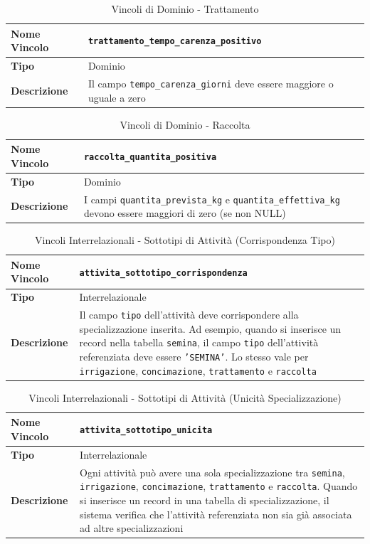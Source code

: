 \documentclass[12pt,a4paper]{article}
\begin{document}
\begin{table}[H]
\centering
\caption{Vincoli di Dominio - Trattamento}
\begin{tabularx}{\textwidth}{|l|X|}
\hline
\textbf{Nome Vincolo} & \texttt{trattamento\_tempo\_carenza\_positivo} \\
\hline
\textbf{Tipo} & Dominio \\
\hline
\textbf{Descrizione} & Il campo \texttt{tempo\_carenza\_giorni} deve essere maggiore o uguale a zero \\
\hline
\end{tabularx}
\end{table}

\begin{table}[H]
\centering
\caption{Vincoli di Dominio - Raccolta}
\begin{tabularx}{\textwidth}{|l|X|}
\hline
\textbf{Nome Vincolo} & \texttt{raccolta\_quantita\_positiva} \\
\hline
\textbf{Tipo} & Dominio \\
\hline
\textbf{Descrizione} & I campi \texttt{quantita\_prevista\_kg} e \texttt{quantita\_effettiva\_kg} devono essere maggiori di zero (se non NULL) \\
\hline
\end{tabularx}
\end{table}

\begin{table}[H]
\centering
\caption{Vincoli Interrelazionali - Sottotipi di Attività (Corrispondenza Tipo)}
\begin{tabularx}{\textwidth}{|l|X|}
\hline
\textbf{Nome Vincolo} & \texttt{attivita\_sottotipo\_corrispondenza} \\
\hline
\textbf{Tipo} & Interrelazionale \\
\hline
\textbf{Descrizione} & Il campo \texttt{tipo} dell'attività deve corrispondere alla specializzazione inserita. Ad esempio, quando si inserisce un record nella tabella \texttt{semina}, il campo \texttt{tipo} dell'attività referenziata deve essere \texttt{'SEMINA'}. Lo stesso vale per \texttt{irrigazione}, \texttt{concimazione}, \texttt{trattamento} e \texttt{raccolta} \\
\hline
\end{tabularx}
\end{table}

\begin{table}[H]
\centering
\caption{Vincoli Interrelazionali - Sottotipi di Attività (Unicità Specializzazione)}
\begin{tabularx}{\textwidth}{|l|X|}
\hline
\textbf{Nome Vincolo} & \texttt{attivita\_sottotipo\_unicita} \\
\hline
\textbf{Tipo} & Interrelazionale \\
\hline
\textbf{Descrizione} & Ogni attività può avere una sola specializzazione tra \texttt{semina}, \texttt{irrigazione}, \texttt{concimazione}, \texttt{trattamento} e \texttt{raccolta}. Quando si inserisce un record in una tabella di specializzazione, il sistema verifica che l'attività referenziata non sia già associata ad altre specializzazioni \\
\hline
\end{tabularx}
\end{table}
\end{document}
